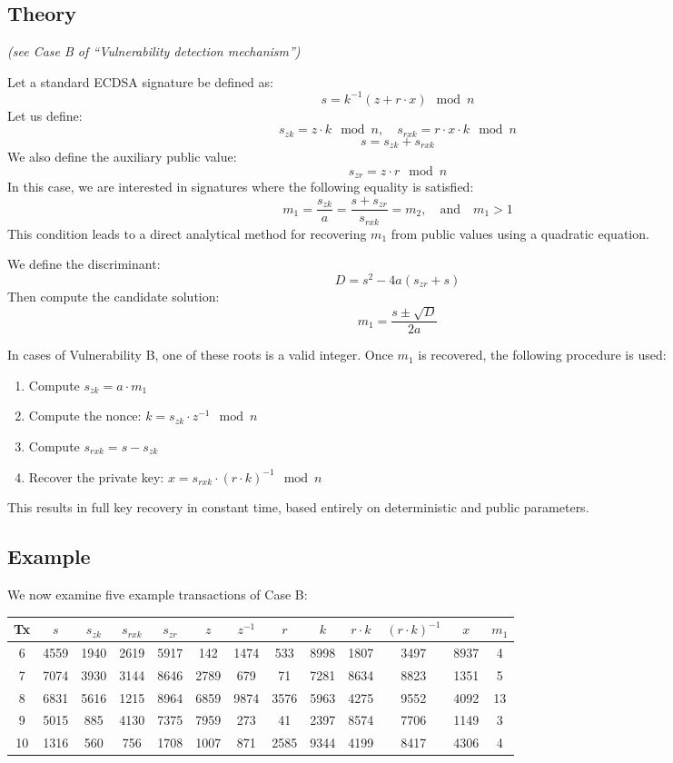 \documentclass[11pt]{article}
\begin{document}
\subsection{Theory}
\textit{(see Case B of “Vulnerability detection mechanism”)}

Let a standard ECDSA signature be defined as:
\[
s = k^{-1}(z + r \cdot x) \mod n
\]
Let us define:
\[
s_{zk} = z \cdot k \mod n, \quad s_{rxk} = r \cdot x \cdot k \mod n
\]
\[
s = s_{zk} + s_{rxk}
\]
We also define the auxiliary public value:
\[
s_{zr} = z \cdot r \mod n
\]
In this case, we are interested in signatures where the following equality is satisfied:
\[
m_1 = \frac{s_{zk}}{a} = \frac{s + s_{zr}}{s_{rxk}} = m_2,\quad \text{and} \quad m_1 > 1
\]
This condition leads to a direct analytical method for recovering $m_1$ from public values using a quadratic equation.

We define the discriminant:
\[
D = s^2 - 4a(s_{zr} + s)
\]
Then compute the candidate solution:
\[
m_1 = \frac{s \pm \sqrt{D}}{2a}
\]

In cases of Vulnerability B, one of these roots is a valid integer. Once $m_1$ is recovered, the following procedure is used:

\begin{enumerate}
    \item Compute $s_{zk} = a \cdot m_1$
    \item Compute the nonce: $k = s_{zk} \cdot z^{-1} \mod n$
    \item Compute $s_{rxk} = s - s_{zk}$
    \item Recover the private key: $x = s_{rxk} \cdot (r \cdot k)^{-1} \mod n$
\end{enumerate}

This results in full key recovery in constant time, based entirely on deterministic and public parameters.

\subsection{Example}
We now examine five example transactions of Case B:

\begin{center}
\small
\begin{tabular}{|c|c|c|c|c|c|c|c|c|c|c|c|c|}
\hline
Tx & $s$ & $s_{zk}$ & $s_{rxk}$ & $s_{zr}$ & $z$ & $z^{-1}$ & $r$ & $k$ & $r \cdot k$ & $(r \cdot k)^{-1}$ & $x$ & $m_1$ \\
\hline
6 & 4559 & 1940 & 2619 & 5917 & 142 & 1474 & 533 & 8998 & 1807 & 3497  & 8937 & 4 \\
7 & 7074 & 3930 & 3144 & 8646 & 2789 & 679 & 71 & 7281 & 8634 & 8823 & 1351 & 5 \\
8 & 6831 & 5616 & 1215 & 8964 & 6859 & 9874 & 3576 & 5963 & 4275 & 9552 & 4092 & 13 \\
9 & 5015 & 885 & 4130 & 7375 & 7959 & 273 & 41 & 2397 & 8574 & 7706 & 1149 & 3 \\
10 & 1316 & 560 & 756 & 1708 & 1007 & 871 & 2585 & 9344 & 4199 & 8417 & 4306 & 4 \\
\hline
\end{tabular}
\end{center}
\end{document}
